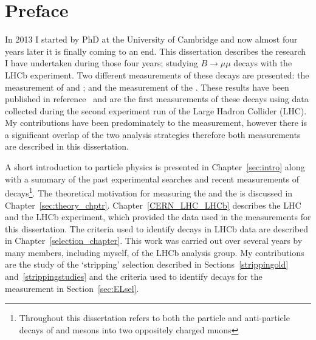 \chapter{Preface}

In 2013 I started by PhD at the University of Cambridge and now almost four years later it is finally coming to an end. This dissertation describes the research I have undertaken during those four years; studying $B \to \mu \mu$ decays with the LHCb experiment. Two different measurements of these decays are presented: the measurement of \bdmumu and \bsmumu \BFs; and the measurement of the \bsmumu \el. These results have been published in reference~\cite{Aaij:2017vad} and are the first measurements of these decays using data collected during the second experiment run of the Large Hadron Collider (LHC). My contributions have been predominately to the \el measurement, however there is a significant overlap of the two analysis strategies therefore both measurements are described in this dissertation.

A short introduction to particle physics is presented in Chapter~\ref{sec:intro} along with a summary of the past experimental searches and recent measurements of \bmumu decays\footnote{Throughout this dissertation \bmumu refers to both the particle and anti-particle decays of \bd and \bs mesons into two oppositely charged muons}. The theoretical motivation for measuring the \bmumu \BFs and the \bsmumu \el is discussed in Chapter~\ref{sec:theory_chptr}.
Chapter~\ref{CERN_LHC_LHCb} describes the LHC and the LHCb experiment, which provided the data used in the measurements for this dissertation.
The criteria used to identify \bmumu decays in LHCb data are described in Chapter~\ref{selection_chapter}. This work was carried out over several years by many members, including myself, of the \bmumu LHCb analysis group. My contributions are the study of the `stripping' selection described in Sections~\ref{strippingold} and~\ref{strippingstudies} and the criteria used to identify \bsmumu decays for the \el measurement in Section~\ref{sec:ELsel}.

